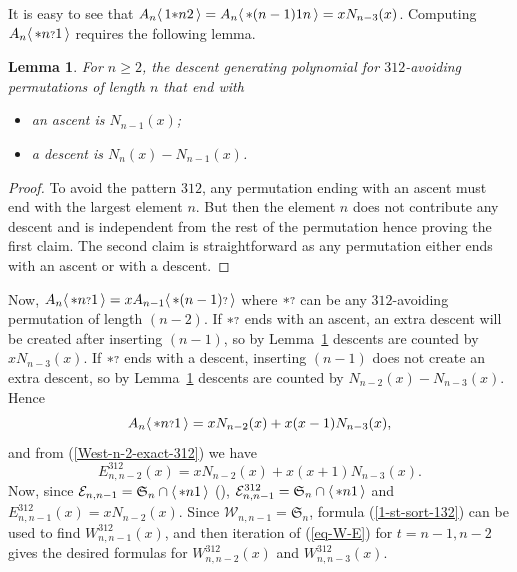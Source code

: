 \documentclass[11pt]{article}
\newtheorem{lem}[thm]{Lemma}
\newcommand{\sortable}[2]{\ensuremath{\mathcal{W}_{#1,#2}}}
\newcommand{\exactly}[2]{\ensuremath{\mathcal{E}_{#1,#2}}}
\newcommand{\sym}{\mathfrak{S}}
\newcommand{\st}{\mbox{\ensuremath{\ast}}}
\newcommand{\q}{\mbox{\ensuremath{\scriptstyle{?}}}}
\newcommand{\+}{\mbox{\ensuremath{\scriptstyle{+}}}}
\newcommand{\glob}[1]{\ensuremath{\langle\, #1\,\rangle}}
\begin{document}
It is easy to see that $A_n \glob{1\st n2}=A_n \glob{\st (n-1)1n}=xN_{n-3}(x)$. Computing $A_n\glob{\st n\q1}$ requires the following lemma.

\begin{lem}\label{312-end-asc} {For $n\geq2$,} the descent generating polynomial for $312$-avoiding permutations of length $n$ that end with
	\begin{itemize}
		\item  an ascent is $N_{n-1}(x)$;
		\item a descent is $N_n(x)-N_{n-1}(x)$.
	\end{itemize}
\end{lem}

\begin{proof} To avoid the pattern $312$, any permutation ending with an ascent must end with the largest element $n$. But then the element $n$ does not contribute any descent and is independent from the rest of the permutation hence proving the first claim. The second claim is straightforward as any permutation either ends with an ascent or with a descent.\end{proof}

Now, $A_n\glob{\st n\q1}=xA_{n-1}\glob{\st (n-1)\q}$ where $\st\q$ can be any $312$-avoiding permutation of length $(n-2)$. If $\st\q$ ends with an ascent, an extra descent will be created after inserting $(n-1)$, so by Lemma~\ref{312-end-asc} descents are counted by $xN_{n-3}(x)$. If $\st\q$ ends with a descent, inserting $(n-1)$ does not create an extra descent, so by Lemma~\ref{312-end-asc} descents are counted by $N_{n-2}(x)-N_{n-3}(x)$. Hence
\begin{equation}\label{stnq1}
	A_n\glob{\st n\q1}=xN_{n-2}(x)+x(x-1)N_{n-3}(x),
\end{equation} and from (\ref{West-n-2-exact-312}) we have
$$E^{312}_{n,n-2}(x)=xN_{n-2}(x)+x(x+1)N_{n-3}(x).$$
Now, since $\exactly{n}{n-1}=\sym_n \cap \glob{\st n1}$ (\cite{West1990Permutations}),  $\exactly{n}{n-1}^{312}=\sym_n \cap \glob{\st n1}$ and $E^{312}_{n,n-1}(x)=xN_{n-2}(x)$. Since $\sortable{n}{n-1}=\sym_n$, formula (\ref{1-st-sort-132}) can be used to find $W^{312}_{n,n-1}(x)$, and then iteration of (\ref{eq-W-E}) for $t=n-1, n-2$ gives the desired formulas for $W^{312}_{n,n-2}(x)$ and $W^{312}_{n,n-3}(x)$.
\end{document}
